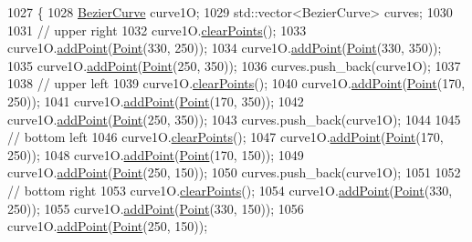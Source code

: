 \begin{DoxyCode}
1027                \{
1028     \mbox{\hyperlink{class_bezier_curve}{BezierCurve}} curve1O;
1029     std::vector<BezierCurve> curves;
1030 
1031     \textcolor{comment}{// upper right}
1032     curve1O.\mbox{\hyperlink{class_bezier_curve_a0ba8ce66d5af5971ae6a1b506029728e}{clearPoints}}();
1033     curve1O.\mbox{\hyperlink{class_bezier_curve_a38d16c18b36ae45619b05e26e226cf34}{addPoint}}(\mbox{\hyperlink{class_point}{Point}}(330, 250));
1034     curve1O.\mbox{\hyperlink{class_bezier_curve_a38d16c18b36ae45619b05e26e226cf34}{addPoint}}(\mbox{\hyperlink{class_point}{Point}}(330, 350));
1035     curve1O.\mbox{\hyperlink{class_bezier_curve_a38d16c18b36ae45619b05e26e226cf34}{addPoint}}(\mbox{\hyperlink{class_point}{Point}}(250, 350));
1036     curves.push\_back(curve1O);
1037 
1038     \textcolor{comment}{// upper left}
1039     curve1O.\mbox{\hyperlink{class_bezier_curve_a0ba8ce66d5af5971ae6a1b506029728e}{clearPoints}}();
1040     curve1O.\mbox{\hyperlink{class_bezier_curve_a38d16c18b36ae45619b05e26e226cf34}{addPoint}}(\mbox{\hyperlink{class_point}{Point}}(170, 250));
1041     curve1O.\mbox{\hyperlink{class_bezier_curve_a38d16c18b36ae45619b05e26e226cf34}{addPoint}}(\mbox{\hyperlink{class_point}{Point}}(170, 350));
1042     curve1O.\mbox{\hyperlink{class_bezier_curve_a38d16c18b36ae45619b05e26e226cf34}{addPoint}}(\mbox{\hyperlink{class_point}{Point}}(250, 350));
1043     curves.push\_back(curve1O);
1044 
1045     \textcolor{comment}{// bottom left}
1046     curve1O.\mbox{\hyperlink{class_bezier_curve_a0ba8ce66d5af5971ae6a1b506029728e}{clearPoints}}();
1047     curve1O.\mbox{\hyperlink{class_bezier_curve_a38d16c18b36ae45619b05e26e226cf34}{addPoint}}(\mbox{\hyperlink{class_point}{Point}}(170, 250));
1048     curve1O.\mbox{\hyperlink{class_bezier_curve_a38d16c18b36ae45619b05e26e226cf34}{addPoint}}(\mbox{\hyperlink{class_point}{Point}}(170, 150));
1049     curve1O.\mbox{\hyperlink{class_bezier_curve_a38d16c18b36ae45619b05e26e226cf34}{addPoint}}(\mbox{\hyperlink{class_point}{Point}}(250, 150));
1050     curves.push\_back(curve1O);
1051 
1052     \textcolor{comment}{// bottom right}
1053     curve1O.\mbox{\hyperlink{class_bezier_curve_a0ba8ce66d5af5971ae6a1b506029728e}{clearPoints}}();
1054     curve1O.\mbox{\hyperlink{class_bezier_curve_a38d16c18b36ae45619b05e26e226cf34}{addPoint}}(\mbox{\hyperlink{class_point}{Point}}(330, 250));
1055     curve1O.\mbox{\hyperlink{class_bezier_curve_a38d16c18b36ae45619b05e26e226cf34}{addPoint}}(\mbox{\hyperlink{class_point}{Point}}(330, 150));
1056     curve1O.\mbox{\hyperlink{class_bezier_curve_a38d16c18b36ae45619b05e26e226cf34}{addPoint}}(\mbox{\hyperlink{class_point}{Point}}(250, 150));

\end{DoxyCode}
